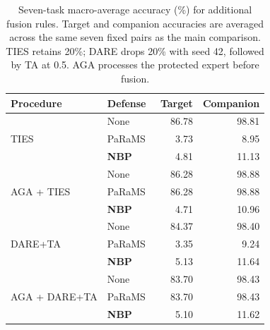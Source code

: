\begin{table}[!htbp]
\centering
\small
\setlength{\tabcolsep}{4pt}
\caption{Seven-task macro-average accuracy (\%) for additional fusion rules. Target and companion accuracies are averaged across the same seven fixed pairs as the main comparison. TIES retains 20\%; DARE drops 20\% with seed 42, followed by TA at 0.5. AGA processes the protected expert before fusion.}
\label{tab:fusion}
\begin{tabular}{llrr}
\toprule
Procedure & Defense & Target & Companion \\
\midrule
\multirow{3}{*}{TIES} & None & 86.78 & 98.81 \\
 & PaRaMS~\cite{wei2025params} & 3.73 & 8.95 \\
 & \textbf{NBP} & 4.81 & 11.13 \\
\midrule
\multirow{3}{*}{AGA + TIES} & None & 86.28 & 98.88 \\
 & PaRaMS~\cite{wei2025params} & 86.28 & 98.88 \\
 & \textbf{NBP} & 4.71 & 10.96 \\
\midrule
\multirow{3}{*}{DARE+TA} & None & 84.37 & 98.40 \\
 & PaRaMS~\cite{wei2025params} & 3.35 & 9.24 \\
 & \textbf{NBP} & 5.13 & 11.64 \\
\midrule
\multirow{3}{*}{AGA + DARE+TA} & None & 83.70 & 98.43 \\
 & PaRaMS~\cite{wei2025params} & 83.70 & 98.43 \\
 & \textbf{NBP} & 5.10 & 11.62 \\
\bottomrule
\end{tabular}
\end{table}
